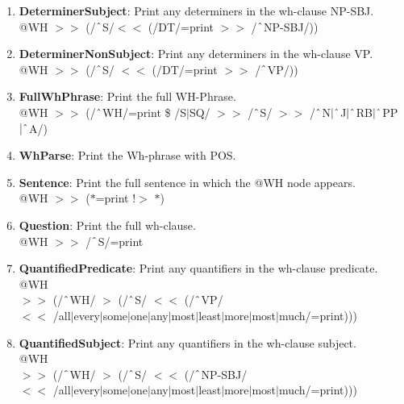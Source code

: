 \begin{enumerate}
    \item \textbf{DeterminerSubject}: Print any determiners in the wh-clause NP-SBJ.\\
    @WH $>\!\!>$ (/$\string^$S/$<\!\!<$ (/DT/=print $>\!\!>$ /$\string^$NP-SBJ/))
    
    \item \textbf{DeterminerNonSubject}: Print any determiners in the wh-clause VP.\\
    @WH $>\!\!>$ (/$\string^$S/ $<\!\!<$ (/DT/=print $>\!\!>$ /$\string^$VP/))

    \item \textbf{FullWhPhrase}: Print the full WH-Phrase.\\
    @WH $>\!\!>$ (/$\string^$WH/=print \$ /S$|$SQ/ $>\!\!>$ /$\string^$S/ $>\!\!>$ /$\string^$N$|\string^$J$|\string^$RB$|\string^$PP$|\string^$A/)

    \item \textbf{WhParse}: Print the Wh-phrase with POS.

    \item \textbf{Sentence}: Print the full sentence in which the @WH node appears.\\
    @WH $>\!\!>$ ($\ast$=print !$>$ $\ast$)

    \item \textbf{Question}: Print the full wh-clause.\\
    @WH $>\!\!>$ /$\string^$S/=print

    \item \textbf{QuantifiedPredicate}: Print any quantifiers in the wh-clause predicate.\\
    @WH \\
    $>\!\!>$ (/$\string^$WH/ $>$ (/$\string^$S/ $<\!\!<$ (/$\string^$VP/\\
    $<\!\!<$ /all$|$every$|$some$|$one$|$any$|$most$|$least$|$more$|$most$|$much/=print)))

    \item \textbf{QuantifiedSubject}: Print any quantifiers in the wh-clause subject.\\
    @WH \\
    $>\!\!>$ (/$\string^$WH/ $>$ (/$\string^$S/ $<\!\!<$ (/$\string^$NP-SBJ/\\
    $<\!\!<$ /all$|$every$|$some$|$one$|$any$|$most$|$least$|$more$|$most$|$much/=print)))

\end{enumerate}




